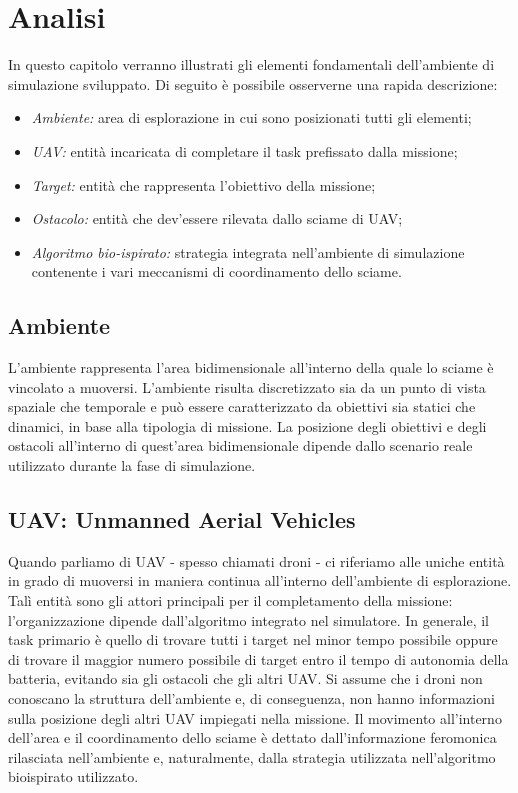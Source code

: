 \chapter{Analisi} \label{analisi}

In questo capitolo verranno illustrati gli elementi fondamentali dell'ambiente di simulazione sviluppato.
Di seguito è possibile osserverne una rapida descrizione:

\begin{itemize}
    \item \textit{Ambiente:} area di esplorazione in cui sono posizionati tutti gli elementi;
    \item \textit{UAV:} entità incaricata di completare il task prefissato dalla missione;
    \item \textit{Target:} entità che rappresenta l'obiettivo della missione;
    \item \textit{Ostacolo:} entità che dev'essere rilevata dallo sciame di UAV;
    \item \textit{Algoritmo bio-ispirato:} strategia integrata nell'ambiente di simulazione contenente i vari meccanismi di coordinamento dello sciame.

\end{itemize}

\section{Ambiente}

L'ambiente rappresenta l'area bidimensionale all'interno della quale lo sciame è vincolato a muoversi.
L'ambiente risulta discretizzato sia da un punto di vista spaziale che temporale e può essere caratterizzato da obiettivi sia statici che dinamici, in base alla tipologia di missione.
La posizione degli obiettivi e degli ostacoli all'interno di quest'area bidimensionale dipende dallo scenario reale utilizzato durante la fase di simulazione.

\section{UAV: Unmanned Aerial Vehicles}

Quando parliamo di UAV - spesso chiamati droni - ci riferiamo alle uniche entità in grado di muoversi in maniera continua all'interno dell'ambiente di esplorazione.
Talì entità sono gli attori principali per il completamento della missione: l'organizzazione dipende dall'algoritmo integrato nel simulatore.
In generale, il task primario è quello di trovare tutti i target nel minor tempo possibile oppure di trovare il maggior numero possibile di target entro il tempo di autonomia della batteria, evitando sia gli ostacoli che gli altri UAV.
Si assume che i droni non conoscano la struttura dell'ambiente e, di conseguenza, non hanno informazioni sulla posizione degli altri UAV impiegati nella missione.
Il movimento all'interno dell'area e il coordinamento dello sciame è dettato dall'informazione feromonica rilasciata nell'ambiente e, naturalmente, dalla strategia utilizzata nell'algoritmo bioispirato utilizzato.

